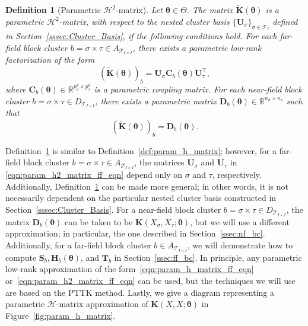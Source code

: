 \documentclass[final,3p,times]{elsarticle}
\newcommand{\mc}[1]{\mathcal{#1}}
\renewcommand{\vec}[1]{\boldsymbol{#1}}
\newcommand{\mat}[1]{\boldsymbol{#1}}
\newcommand{\R}{\mathbb{R}}
\newcommand{\mathat}[1]{\widetilde{\boldsymbol{#1}}}
\newtheorem{definition}{Definition}
\begin{document}
\begin{definition}[Parametric $\mc{H}^{2}$-matrix]\label{def:param_h2_matrix}
Let $\vec{\theta} \in \Theta$. The matrix $\mathat{K}(\vec{\theta})$ is a \emph{parametric $\mc{H}^{2}$-matrix}, with respect to the nested cluster basis $\{\mat{U}_{\sigma} \}_{\sigma \in \mc{T}_{I}}$ defined in Section~\ref{sssec:Cluster_Basis}, if the following conditions hold. For each far-field block cluster $b = \sigma \times \tau \in A_{\mc{T}_{I \times I}}$, there exists a parametric low-rank factorization of the form
   \begin{equation}\label{eqn:param_h2_matrix_ff_eqn}
   (\mathat{K}(\vec{\theta}))_b = \mat{U}_{\sigma}\mat{C}_{b}(\vec{\theta})\mat{U}_{\tau}^{\top},
   \end{equation}
   where $\mat{C}_{b}(\vec{\theta}) \in \R^{p_s^d \times p_s^d}$ is a parametric coupling matrix.  For each near-field block cluster $b = \sigma \times \tau \in D_{\mc{T}_{I \times I}}$, there exists a parametric matrix $\mat{D}_{b}(\vec{\theta}) \in \R^{n_{\sigma} \times n_{\tau}}$ such that 
   \begin{equation}\label{eqn:param_h2_matrix_nf_eqn}
          (\mathat{K}(\vec{\theta}))_b = \mat{D}_{b}(\vec{\theta}).
   \end{equation}
\end{definition}

Definition~\ref{def:param_h2_matrix} is similar to Definition~\ref{def:param_h_matrix}; however, for a far-field block cluster $b=\sigma \times \tau \in A_{\mc{T}_{I \times I}}$, the matrices $\mat{U}_{\sigma}$ and $\mat{U}_{\tau}$ in \eqref{eqn:param_h2_matrix_ff_eqn}  depend only on $\sigma$ and $\tau$, respectively. Additionally, Definition~\ref{def:param_h2_matrix} can be made more general; in other words, it is not necessarily dependent on the particular nested cluster basis constructed in Section~\ref{sssec:Cluster_Basis}. For a near-field block cluster $b = \sigma \times \tau \in D_{\mc{T}_{I \times I}}$, the matrix $\mat{D}_{b}(\vec{\theta})$ can be taken to be $\mat{K}(X_{\sigma}, X_{\tau}; \vec{\theta})$, but we will use a different approximation; in particular, the one described in Section~\ref{ssec:nf_bc}. Additionally, for a far-field block cluster $b \in A_{\mc{T}_{I \times I}}$, we will demonstrate how to compute $\mat{S}_{b}, \mat{H}_{b}(\vec{\theta})$, and $\mat{T}_{b}$ in Section~\ref{ssec:ff_bc}. In principle, any parametric low-rank approximation of the form~\eqref{eqn:param_h_matrix_ff_eqn} or~\eqref{eqn:param_h2_matrix_ff_eqn} can be used, but the techniques we will use are based on the PTTK method. Lastly,  
we give a diagram representing a parametric $\mc{H}$-matrix approximation of $\mat{K}(X, X; \vec{\theta})$ in Figure~\ref{fig:param_h_matrix}.
\end{document}
